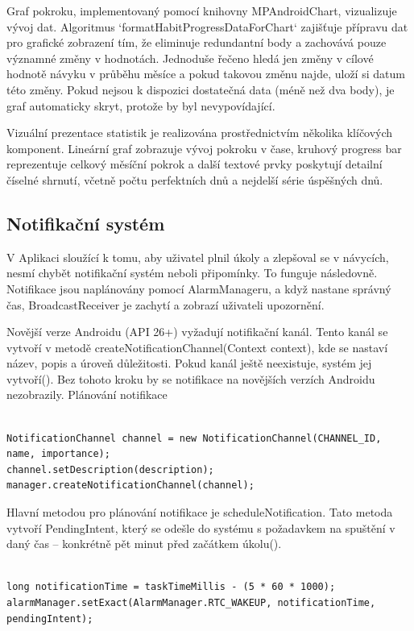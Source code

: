 Graf pokroku, implementovaný pomocí knihovny MPAndroidChart, vizualizuje vývoj dat. Algoritmus `formatHabitProgressDataForChart` zajišťuje přípravu dat pro grafické zobrazení tím, že eliminuje redundantní body a zachovává pouze významné změny v hodnotách. Jednoduše řečeno hledá jen změny v cílové hodnotě návyku v průběhu měsíce a pokud takovou změnu najde, uloží si datum této změny. Pokud nejsou k dispozici dostatečná data (méně než dva body), je graf automaticky skryt, protože by byl nevypovídající.

Vizuální prezentace statistik je realizována prostřednictvím několika klíčových komponent. Lineární graf zobrazuje vývoj pokroku v čase, kruhový progress bar reprezentuje celkový měsíční pokrok a další textové prvky poskytují detailní číselné shrnutí, včetně počtu perfektních dnů a nejdelší série úspěšných dnů.
\newpage
\subsection{Notifikační systém}
\hspace{14pt} V Aplikaci sloužící k tomu, aby uživatel plnil úkoly a zlepšoval se v návycích, nesmí chybět notifikační systém neboli připomínky. To funguje následovně. Notifikace jsou naplánovány pomocí AlarmManageru, a když nastane správný čas, BroadcastReceiver je zachytí a zobrazí uživateli upozornění.

Novější verze Androidu (API 26+) vyžadují notifikační kanál. Tento kanál se vytvoří v metodě createNotificationChannel(Context context), kde se nastaví název, popis a úroveň důležitosti. Pokud kanál ještě neexistuje, systém jej vytvoří(). Bez tohoto kroku by se notifikace na novějších verzích Androidu nezobrazily.
Plánování notifikace

\begin{lstlisting}[style=javastyle,caption = {NotificationChannel},label = {lst:NotificationChannel}]

NotificationChannel channel = new NotificationChannel(CHANNEL_ID, name, importance);
channel.setDescription(description);
manager.createNotificationChannel(channel);

\end{lstlisting}

Hlavní metodou pro plánování notifikace je scheduleNotification. Tato metoda vytvoří PendingIntent, který se odešle do systému s požadavkem na spuštění v daný čas – konkrétně pět minut před začátkem úkolu().

\begin{lstlisting}[style=javastyle,caption = {alarmManager},label = {alarmManagere}]

long notificationTime = taskTimeMillis - (5 * 60 * 1000);
alarmManager.setExact(AlarmManager.RTC_WAKEUP, notificationTime, pendingIntent);

\end{lstlisting}

